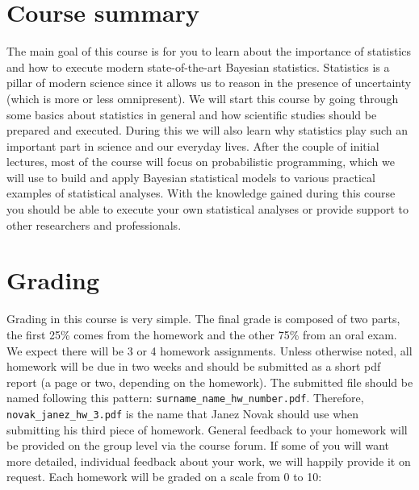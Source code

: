 \documentclass[fleqn,moreauthors,10pt]{ds_report}
\begin{document}
\flushbottom

\maketitle

\thispagestyle{empty}


\section*{Course summary}

The main goal of this course is for you to learn about the importance of statistics and how to execute modern state-of-the-art Bayesian statistics. Statistics is a pillar of modern science since it allows us to reason in the presence of uncertainty (which is more or less omnipresent). We will start this course by going through some basics about statistics in general and how scientific studies should be prepared and executed. During this we will also learn why statistics play such an important part in science and our everyday lives. After the couple of initial lectures, most of the course will focus on probabilistic programming, which we will use to build and apply Bayesian statistical models to various practical examples of statistical analyses. With the knowledge gained during this course you should be able to execute your own statistical analyses or provide support to other researchers and professionals.

\section*{Grading}

Grading in this course is very simple. The final grade is composed of two parts, the first 25\% comes from the homework and the other 75\% from an oral exam. We expect there will be 3 or 4 homework assignments. Unless otherwise noted, all homework will be due in two weeks and should be submitted as a short pdf report (a page or two, depending on the homework). The submitted file should be named following this pattern: \texttt{surname\_name\_hw\_number.pdf}. Therefore, \texttt{novak\_janez\_hw\_3.pdf} is the name that Janez Novak should use when submitting his third piece of homework. General feedback to your homework will be provided on the group level via the course forum. If some of you will want more detailed, individual feedback about your work, we will happily provide it on request. Each homework will be graded on a scale from 0 to 10:
\end{document}

